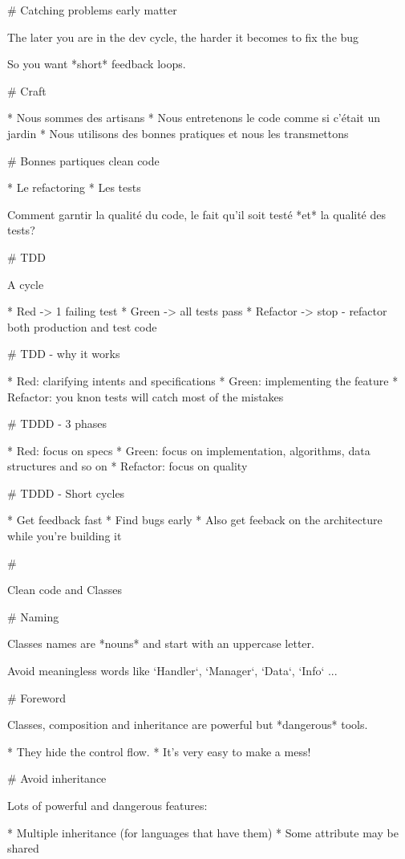 # Catching problems early matter

The later you are in the dev cycle, the harder
it becomes to fix the bug

So you want *short* feedback loops.

# Craft

* Nous sommes des artisans
* Nous entretenons le code comme si c'était un jardin
* Nous utilisons des bonnes pratiques et nous les transmettons

# Bonnes partiques clean code

* Le refactoring
* Les tests

Comment garntir la qualité du code, le fait qu'il soit testé *et* la qualité des tests?

# TDD

A cycle

* Red -> 1 failing test
* Green -> all tests pass
* Refactor -> stop - refactor both production and test code



# TDD - why it works

* Red: clarifying intents and specifications
* Green: implementing the feature
* Refactor: you knon tests will catch most of the mistakes

# TDDD - 3 phases

* Red: focus on specs
* Green: focus on implementation, algorithms, data structures and so on
* Refactor: focus on quality

# TDDD - Short cycles

 * Get feedback fast
 * Find bugs early
 * Also get feeback on the architecture while you're building it


#

\huge \center Clean code and Classes

# Naming

Classes names are *nouns* and start with an uppercase letter.

Avoid meaningless words like `Handler`, `Manager`, `Data`, `Info` ...

# Foreword

Classes, composition and inheritance are powerful but *dangerous* tools.

* They hide the control flow.
* It's very easy to make a mess!

# Avoid inheritance

Lots of powerful and dangerous features:

* Multiple inheritance (for languages that have them)
* Some attribute may be shared

